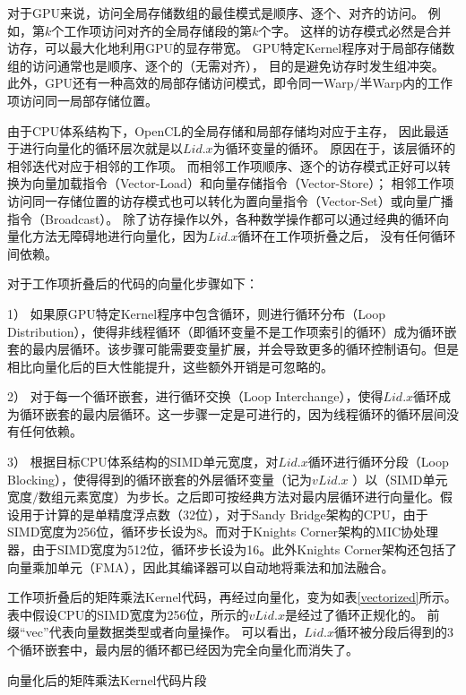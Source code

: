 对于GPU来说，访问全局存储数组的最佳模式是顺序、逐个、对齐的访问。
例如，第$k$个工作项访问对齐的全局存储段的第$k$个字。
这样的访存模式必然是合并访存，可以最大化地利用GPU的显存带宽。
GPU特定Kernel程序对于局部存储数组的访问通常也是顺序、逐个的（无需对齐），
目的是避免访存时发生组冲突。
此外，GPU还有一种高效的局部存储访问模式，即令同一Warp$/$半Warp内的工作项访问同一局部存储位置。

由于CPU体系结构下，OpenCL的全局存储和局部存储均对应于主存，
因此最适于进行向量化的循环层次就是以$Lid.x$为循环变量的循环。
原因在于，该层循环的相邻迭代对应于相邻的工作项。
而相邻工作项顺序、逐个的访存模式正好可以转换为向量加载指令（Vector-Load）和向量存储指令（Vector-Store）；
相邻工作项访问同一存储位置的访存模式也可以转化为置向量指令（Vector-Set）或向量广播指令（Broadcast）。
除了访存操作以外，各种数学操作都可以通过经典的循环向量化方法无障碍地进行向量化，因为$Lid.x$循环在工作项折叠之后，
没有任何循环间依赖。

对于工作项折叠后的代码的向量化步骤如下：
\begin{compactitem}
\item[1）]{如果原GPU特定Kernel程序中包含循环，则进行循环分布（Loop Distribution），使得非线程循环（即循环变量不是工作项索引的循环）成为循环嵌套的最内层循环。该步骤可能需要变量扩展，并会导致更多的循环控制语句。但是相比向量化后的巨大性能提升，这些额外开销是可忽略的。}
\item[2）]{对于每一个循环嵌套，进行循环交换（Loop Interchange），使得$Lid.x$循环成为循环嵌套的最内层循环。这一步骤一定是可进行的，因为线程循环的循环层间没有任何依赖。}
\item[3）]{根据目标CPU体系结构的SIMD单元宽度，对$Lid.x$循环进行循环分段（Loop Blocking），使得得到的循环嵌套的外层循环变量（记为$vLid.x$ ）以（SIMD单元宽度$/$数组元素宽度）为步长。之后即可按经典方法对最内层循环进行向量化。假设用于计算的是单精度浮点数（32位），对于Sandy Bridge架构的CPU，由于SIMD宽度为256位，循环步长设为8。而对于Knights Corner架构的MIC协处理器，由于SIMD宽度为512位，循环步长设为16。此外Knights Corner架构还包括了向量乘加单元（FMA），因此其编译器可以自动地将乘法和加法融合。}
\end{compactitem}

工作项折叠后的矩阵乘法Kernel代码，再经过向量化，变为如表\ref{vectorized}所示。
表中假设CPU的SIMD宽度为256位，所示的$vLid.x$是经过了循环正规化的。
前缀``vec''代表向量数据类型或者向量操作。
可以看出，$Lid.x$循环被分段后得到的3个循环嵌套中，最内层的循环都已经因为完全向量化而消失了。

\begin{table}[htb]
\centering
\caption{向量化后的矩阵乘法Kernel代码片段}
\label{vectorized}
\end{table}

